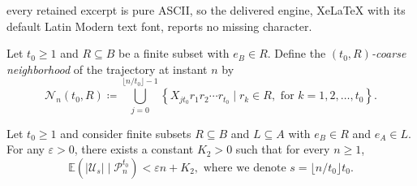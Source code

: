 \documentclass[10pt,a4paper]{amsart}
\newcommand{\E}{\mathbb{E}}
\begin{document}
every retained excerpt is pure ASCII, so the delivered engine, XeLaTeX with its default Latin Modern text font, reports no missing character.
\begin{defn}\label{def:neighborhood of coarse traj}
	Let $t_0\ge 1$ and $R\subseteq B$ be a finite subset with $e_B\in R$. Define the \emph{$(t_0,R)$-coarse neighborhood} of the trajectory at instant $n$ by
	\begin{equation*}
		\mathcal{N}_n(t_0,R)\coloneqq \bigcup_{j=0}^{\lfloor n/t_0 \rfloor -1} \left\{ X_{jt_0}r_1r_2\cdots r_{t_0}\mid r_k\in R, \text{ for }k=1,2,\ldots,t_0 \right \}.
	\end{equation*}
\end{defn}

\begin{lem}\label{lem: expectation of unstable points is small} Let $t_0\ge 1$ and consider finite subsets $R\subseteq B$ and $L\subseteq A$ with $e_B\in R$ and $e_A\in L$. For any $\varepsilon>0$, there exists a constant $K_2>0$ such that for every $n\ge 1$, 
	\begin{equation*}\E\left(|\mathcal{U}_s| \mid \mathcal{P}_n^{t_0}\right)<\varepsilon n+K_2, \text{ where we denote }s=\lfloor n/t_0\rfloor t_0.
	\end{equation*}
\end{lem}
\end{document}
